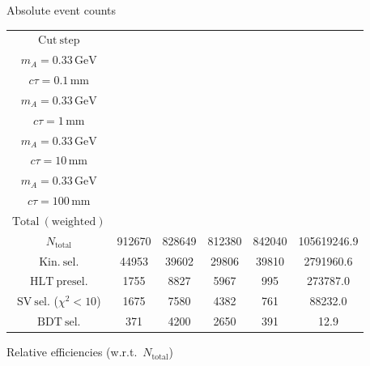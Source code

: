 \documentclass[10pt,a4paper]{article}
\renewcommand{\arraystretch}{1.4}
\begin{document}
{\footnotesize\setlength{\tabcolsep}{4pt}\renewcommand{\arraystretch}{1.05}%
\vspace{12pt}

Absolute event counts

\begin{tabular}{cccccc}
\toprule
$\mathrm{Cut\ step}$ & \shortstack{$m_{\pi}=1\,\mathrm{GeV}$\\$m_{A}=0.33\,\mathrm{GeV}$\\$c\tau=0.1\,\mathrm{mm}$} & \shortstack{$m_{\pi}=1\,\mathrm{GeV}$\\$m_{A}=0.33\,\mathrm{GeV}$\\$c\tau=1\,\mathrm{mm}$} & \shortstack{$m_{\pi}=1\,\mathrm{GeV}$\\$m_{A}=0.33\,\mathrm{GeV}$\\$c\tau=10\,\mathrm{mm}$} & \shortstack{$m_{\pi}=1\,\mathrm{GeV}$\\$m_{A}=0.33\,\mathrm{GeV}$\\$c\tau=100\,\mathrm{mm}$} & \shortstack{$\mathrm{QCD}$\\$\mathrm{Total\ (weighted)}$} \\
\midrule
$N_{\mathrm{total}}$ & 912670 & 828649 & 812380 & 842040 & 105619246.9\\
$\mathrm{Kin.\ sel.}$ & 44953 & 39602 & 29806 & 39810 & 2791960.6\\
$\mathrm{HLT\ presel.}$ & 1755 & 8827 & 5967 & 995 & 273787.0\\
$\mathrm{SV\ sel.}$ ($\chi^2{<}10$) & 1675 & 7580 & 4382 & 761 & 88232.0\\
$\mathrm{BDT\ sel.}$ & 371 & 4200 & 2650 & 391 & 12.9\\
\bottomrule
\end{tabular}

\vspace{18pt}

Relative efficiencies (w.r.t.\ $N_{\mathrm{total}}$)

}
\end{document}
